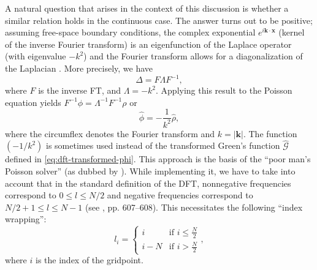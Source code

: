 A natural question that arises in the context of this discussion is whether a similar relation holds in the continuous case.
The answer turns out to be positive;
assuming free-space boundary conditions, the complex exponential $e^{i \mathbf{k} \cdot \mathbf{x}}$ (kernel of the inverse Fourier transform) is an eigenfunction of the Laplace operator (with eigenvalue $-k^2$) and the Fourier transform allows for a diagonalization of the Laplacian \cite{demanet2013fourier}.
More precisely, we have
\begin{equation*}
    \Delta = F \Lambda F^{-1},
\end{equation*}
where $F$ is the inverse FT, and $\Lambda = -k^2$.
Applying this result to the Poisson equation yields $F^{-1}\phi = \Lambda^{-1}F^{-1}\rho$ or
\begin{equation}\label{eq:poor-mans-poisson-solver}
    \hat\phi = -\frac{1}{k^2} \hat\rho,
\end{equation}
where the circumflex denotes the Fourier transform and $k = |\mathbf{k}|$.
The function $(-1/k^2)$ is sometimes used instead of the transformed Green's function $\hat{\mathcal{G}}$ defined in \autoref{eq:dft-transformed-phi}.
This approach is the basis of the ``poor man's Poisson solver'' (as dubbed by \cite{Hockney1988}).
While implementing it, we have to take into account that in the standard definition of the DFT, nonnegative frequencies correspond to $0 \leq l \leq N/2$ and negative frequencies correspond to $N/2+1 \leq l \leq N-1$ (see \cite{press2007numerical}, pp. 607--608).
This necessitates the following ``index wrapping'':
\begin{equation*}
    l_i =
    \begin{cases}
        i     & \text{if } i \leq \frac{N}{2} \\
        i - N & \text{if } i > \frac{N}{2}
    \end{cases},
\end{equation*}
where $i$ is the index of the gridpoint.
